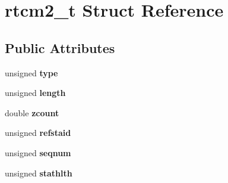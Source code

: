 \hypertarget{structrtcm2__t}{\section{rtcm2\-\_\-t \-Struct \-Reference}
\label{structrtcm2__t}
}
\subsection*{\-Public \-Attributes}
\begin{DoxyCompactItemize}
\item 
\hypertarget{structrtcm2__t_a882d9e5c073d2fcf68f3c789c83a1747}{unsigned {\bfseries type}}\label{structrtcm2__t_a882d9e5c073d2fcf68f3c789c83a1747}

\item 
\hypertarget{structrtcm2__t_a682e3d75f902a5c2a544522bce3eaf89}{unsigned {\bfseries length}}\label{structrtcm2__t_a682e3d75f902a5c2a544522bce3eaf89}

\item 
\hypertarget{structrtcm2__t_a0d6ac46d3ccde56278d3cc8c41100b0d}{double {\bfseries zcount}}\label{structrtcm2__t_a0d6ac46d3ccde56278d3cc8c41100b0d}

\item 
\hypertarget{structrtcm2__t_ac4940e89cc616800263a8acaa54af3ca}{unsigned {\bfseries refstaid}}\label{structrtcm2__t_ac4940e89cc616800263a8acaa54af3ca}

\item 
\hypertarget{structrtcm2__t_adfba38c6a6046c39b8601a67fb24337b}{unsigned {\bfseries seqnum}}\label{structrtcm2__t_adfba38c6a6046c39b8601a67fb24337b}

\item 
\hypertarget{structrtcm2__t_a657511a3a9cebab99ee90b204e21b6c5}{unsigned {\bfseries stathlth}}\label{structrtcm2__t_a657511a3a9cebab99ee90b204e21b6c5}


\end{DoxyCompactItemize}

